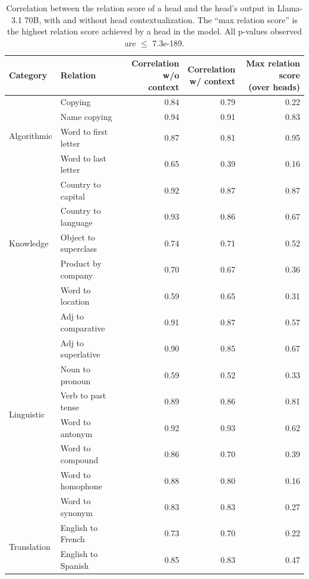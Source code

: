 \documentclass[11pt]{article}
\newcommand{\llamaThreeSeventyB}{Llama-3.1 70B}
\begin{document}
\begin{table}[p]
\centering
\footnotesize
\begin{tabular}{llrrr}
\toprule
Category & Relation & \makecell{Correlation\\w/o context} & \makecell{Correlation\\w/ context} & \makecell{Max relation score\\(over heads)} \\
\midrule
\multirow{4}{*}{Algorithmic} & Copying & 0.84 &  0.79 &  0.22 \\
 & Name copying & 0.94 &  0.91 &  0.83 \\
 & Word to first letter & 0.87 &  0.81 &  0.95 \\
 & Word to last letter & 0.65 &  0.39 & 0.16 \\
\midrule
\multirow{5}{*}{Knowledge} & Country to capital & 0.92 &  0.87 &  0.87 \\
 & Country to language & 0.93 &  0.86 &  0.67 \\
 & Object to superclass & 0.74 &  0.71 &  0.52 \\
 & Product by company & 0.70 &  0.67 &  0.36 \\
 & Word to location & 0.59 &  0.65 &  0.31 \\
\midrule
\multirow{8}{*}{Linguistic} & Adj to comparative & 0.91 &  0.87 &  0.57 \\
 & Adj to superlative & 0.90 &  0.85 &  0.67 \\
 & Noun to pronoun & 0.59 &  0.52 &  0.33 \\
 & Verb to past tense & 0.89 &  0.86 &  0.81 \\
  & Word to antonym & 0.92 &  0.93 &  0.62 \\
 & Word to compound & 0.86 &  0.70 &  0.39 \\
 & Word to homophone & 0.88 &  0.80 &  0.16 \\
 & Word to synonym & 0.83 &  0.83 &  0.27 \\
\midrule
\multirow{2}{*}{Translation} & English to French & 0.73 &  0.70 &  0.22 \\
 & English to Spanish & 0.85 &  0.83 & 0.47 \\
\bottomrule
\end{tabular}
\caption{Correlation between the relation score of a head and the head's output in \llamaThreeSeventyB{}, with and without head contextualization. The ``max relation score'' is the highest relation score achieved by a head in the model. All p-values observed are $\leq$ 7.3e-189.} 
\label{tab:Dynamic_results_llama_70_full}
\end{table}
\end{document}

